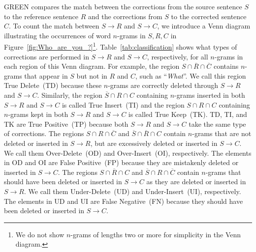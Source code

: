 \documentclass[11pt]{article}
\begin{document}
GREEN compares the match between the corrections from the source sentence $S$ to the reference sentence $R$ and the corrections from $S$ to the corrected sentence $C$.
To count the match between $S \to R$ and $S \to C$, we introduce a Venn diagram illustrating the occurrences of word $n$-grams in $S, R, C$ in Figure~\ref{fig:Who_are_you_?}\footnote{We do not show $n$-grams of lengths two or more for simplicity in the Venn diagram.}.
Table~\ref{tab:classification} shows what types of corrections are performed in $S \to R$ and $S \to C$, respectively, for all $n$-grams in each region of this Venn diagram.
For example, the region $S \cap \overline{R} \cap \overline{C}$ contains $n$-grams that appear in $S$ but not in $R$ and $C$, such as ``\textit{What}''.
We call this region \textsf{True Delete}~(\textsf{TD}) because these $n$-grams are correctly deleted through $S \to R$ and $S \to C$.
Similarly, the region $\overline{S} \cap R \cap C$ containing $n$-grams inserted in both $S \to R$ and $S \to C$ is called \textsf{True Insert}~(\textsf{TI}) and the region $S \cap R \cap C$ containing $n$-grams kept in both $S \to R$ and $S \to C$ is called \textsf{True Keep}~(\textsf{TK}).
\textsf{TD}, \textsf{TI}, and \textsf{TK} are \textsf{True Positive}~(\textsf{TP}) because both $S \to R$ and $S \to C$ take the same type of corrections.
The regions $S \cap R \cap \overline{C}$ and $\overline{S} \cap \overline{R} \cap C$ contain $n$-grams that are not deleted or inserted in $S \to R$, but are excessively deleted or inserted in $S \to C$.
We call them \textsf{Over-Delete}~(\textsf{OD}) and \textsf{Over-Insert}~(\textsf{OI}), respectively.
The elements in \textsf{OD} and \textsf{OI} are \textsf{False Positive}~(\textsf{FP}) because they are mistakenly deleted or inserted in $S \to C$.
The regions $S \cap \overline{R} \cap C$ and $\overline{S} \cap R \cap \overline{C}$ contain $n$-grams that should have been deleted or inserted in $S \to C$ as they are deleted or inserted in $S \to R$.
We call them \textsf{Under-Delete}~(\textsf{UD}) and \textsf{Under-Insert}~(\textsf{UI}), respectively.
The elements in \textsf{UD} and \textsf{UI} are \textsf{False Negative}~(\textsf{FN}) because they should have been deleted or inserted in $S \to C$.
\end{document}
